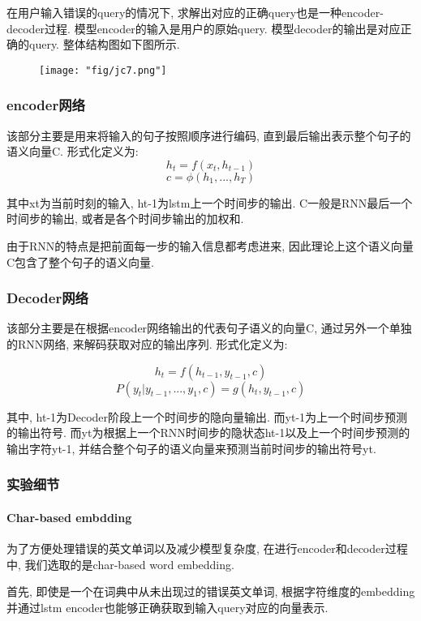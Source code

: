 在用户输入错误的query的情况下, 求解出对应的正确query也是一种encoder-decoder过程. 模型encoder的输入是用户的原始query.  模型decoder的输出是对应正确的query. 整体结构图如下图所示.

\begin{figure}[!h]
	\centering
	\texttt{[image: "fig/jc7.png"]}
	\caption{}
	\label{fig:jc7}
\end{figure}

\subsubsection{encoder网络}

该部分主要是用来将输入的句子按照顺序进行编码, 直到最后输出表示整个句子的语义向量C. 形式化定义为:
$$ h_t = f(x_t,h_{t-1}) $$
$$ c = \phi (h_1,...,h_T) $$

其中xt为当前时刻的输入, ht-1为lstm上一个时间步的输出. C一般是RNN最后一个时间步的输出, 或者是各个时间步输出的加权和.

由于RNN的特点是把前面每一步的输入信息都考虑进来, 因此理论上这个语义向量C包含了整个句子的语义向量.

\subsubsection{Decoder网络}

该部分主要是在根据encoder网络输出的代表句子语义的向量C, 通过另外一个单独的RNN网络, 来解码获取对应的输出序列. 形式化定义为:

$$ h_t = f(h_{t-1},y_{t-1},c) $$
$$ P(y_t|y_{t-1},...,y_1,c) = g(h_t,y_{t-1},c) $$

其中, ht-1为Decoder阶段上一个时间步的隐向量输出. 而yt-1为上一个时间步预测的输出符号. 而yt为根据上一个RNN时间步的隐状态ht-1以及上一个时间步预测的输出字符yt-1, 并结合整个句子的语义向量来预测当前时间步的输出符号yt.

\subsubsection{实验细节}

\paragraph{Char-based embdding}

为了方便处理错误的英文单词以及减少模型复杂度, 在进行encoder和decoder过程中, 我们选取的是char-based word embedding. 

\par 首先, 即使是一个在词典中从未出现过的错误英文单词, 根据字符维度的embedding并通过lstm encoder也能够正确获取到输入query对应的向量表示. 

